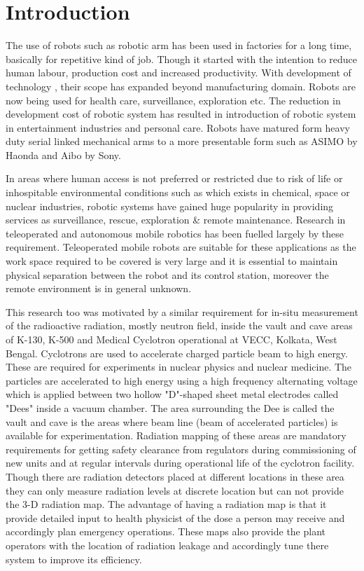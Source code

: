 \chapter{{Introduction}}
\label{ch_1}
The use of robots such as robotic arm  has been used in factories for a long time, basically for repetitive kind  of job. Though it started with the intention to reduce human labour, production cost and increased productivity. With development of technology ,  their scope has expanded beyond  manufacturing domain. Robots are now being used for health care, surveillance, exploration etc. The reduction in development cost of  robotic system has resulted in introduction of robotic system in entertainment industries and personal care. Robots have matured form heavy duty serial linked mechanical arms to a more presentable form such as ASIMO by Haonda and Aibo by Sony.  

 In areas where human access is not preferred or restricted  due to risk of life or inhospitable environmental conditions such as which exists in chemical, space or nuclear industries, robotic systems have gained huge popularity in providing services as surveillance, rescue, exploration \& remote maintenance.  Research in teleoperated and autonomous mobile robotics has been fuelled largely by these  requirement. Teleoperated mobile robots are suitable for these applications  as the work space required to be covered is very large and it is essential to maintain  physical separation between the robot and its control station,   moreover the remote environment is in general unknown. 
 
 This research too was motivated by a similar requirement for in-situ measurement of the radioactive radiation, mostly neutron field, inside the vault and cave areas of   K-130,  K-500  and Medical Cyclotron operational at VECC, Kolkata, West Bengal. Cyclotrons are used to accelerate  charged particle beam to high energy. These are required for experiments in nuclear physics and nuclear medicine. The particles are accelerated to high energy using a high frequency alternating voltage which is applied between two hollow "D"-shaped sheet metal electrodes called "Dees" inside a vacuum chamber. The area surrounding the Dee is called the vault  and cave is the areas where beam line (beam of  accelerated particles) is available for experimentation. Radiation mapping of these areas are  mandatory requirements for getting safety clearance from regulators during  commissioning of new units and at regular intervals during operational life of the cyclotron facility.   Though there are radiation detectors placed at different locations in these area they can only measure radiation levels at discrete location but can not provide the 3-D radiation  map. The advantage of having a  radiation map is that it  provide detailed  input to health physicist  of the dose a person may receive and accordingly plan emergency  operations. These maps also provide the plant operators with the location of radiation leakage and accordingly tune there system to improve its efficiency.

